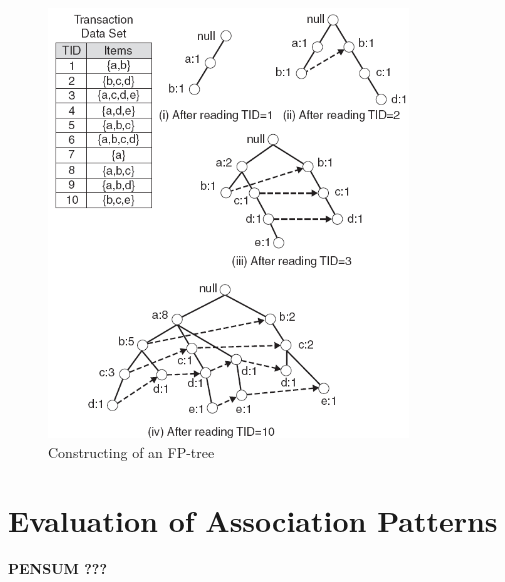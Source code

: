  		\begin{figure}[H]
 				\centering
 				\includegraphics[scale=0.7]{pics/fptree.png}
 				\caption{Constructing of an FP-tree}
 		\end{figure}


 	\section{Evaluation of Association Patterns}


 		{\bf \Huge \color{red} PENSUM ???}